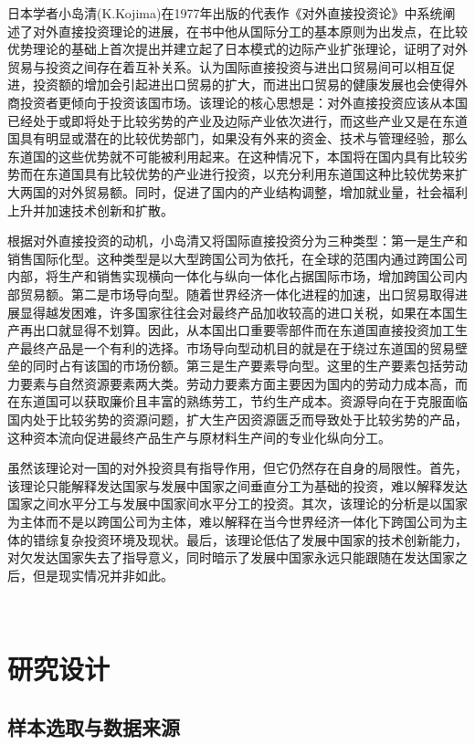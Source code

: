 \documentclass{article}
\begin{document}
{日本学者小岛清(K.Kojima)在1977年出版的代表作《对外直接投资论》中系统阐述了对外直接投资理论的进展，在书中他从国际分工的基本原则为出发点，在比较优势理论的基础上首次提出并建立起了日本模式的边际产业扩张理论，证明了对外贸易与投资之间存在着互补关系。认为国际直接投资与进出口贸易间可以相互促进，投资额的增加会引起进出口贸易的扩大，而进出口贸易的健康发展也会使得外商投资者更倾向于投资该国市场。该理论的核心思想是：对外直接投资应该从本国已经处于或即将处于比较劣势的产业及边际产业依次进行，而这些产业又是在东道国具有明显或潜在的比较优势部门，如果没有外来的资金、技术与管理经验，那么东道国的这些优势就不可能被利用起来。在这种情况下，本国将在国内具有比较劣势而在东道国具有比较优势的产业进行投资，以充分利用东道国这种比较优势来扩大两国的对外贸易额。同时，促进了国内的产业结构调整，增加就业量，社会福利上升并加速技术创新和扩散。

根据对外直接投资的动机，小岛清又将国际直接投资分为三种类型：第一是生产和销售国际化型。这种类型是以大型跨国公司为依托，在全球的范围内通过跨国公司内部，将生产和销售实现横向一体化与纵向一体化占据国际市场，增加跨国公司内部贸易额。第二是市场导向型。随着世界经济一体化进程的加速，出口贸易取得进展显得越发困难，许多国家往往会对最终产品加收较高的进口关税，如果在本国生产再出口就显得不划算。因此，从本国出口重要零部件而在东道国直接投资加工生产最终产品是一个有利的选择。市场导向型动机目的就是在于绕过东道国的贸易壁垒的同时占有该国的市场份额。第三是生产要素导向型。这里的生产要素包括劳动力要素与自然资源要素两大类。劳动力要素方面主要因为国内的劳动力成本高，而在东道国可以获取廉价且丰富的熟练劳工，节约生产成本。资源导向在于克服面临国内处于比较劣势的资源问题，扩大生产因资源匮乏而导致处于比较劣势的产品，这种资本流向促进最终产品生产与原材料生产间的专业化纵向分工。

虽然该理论对一国的对外投资具有指导作用，但它仍然存在自身的局限性。首先，该理论只能解释发达国家与发展中国家之间垂直分工为基础的投资，难以解释发达国家之间水平分工与发展中国家间水平分工的投资。其次，该理论的分析是以国家为主体而不是以跨国公司为主体，难以解释在当今世界经济一体化下跨国公司为主体的错综复杂投资环境及现状。最后，该理论低估了发展中国家的技术创新能力，对欠发达国家失去了指导意义，同时暗示了发展中国家永远只能跟随在发达国家之后，但是现实情况并非如此。



{\ }

\noindent  \section{研究设计}

\noindent  \subsection{样本选取与数据来源}
\vspace{0.1cm}




}
\end{document}
